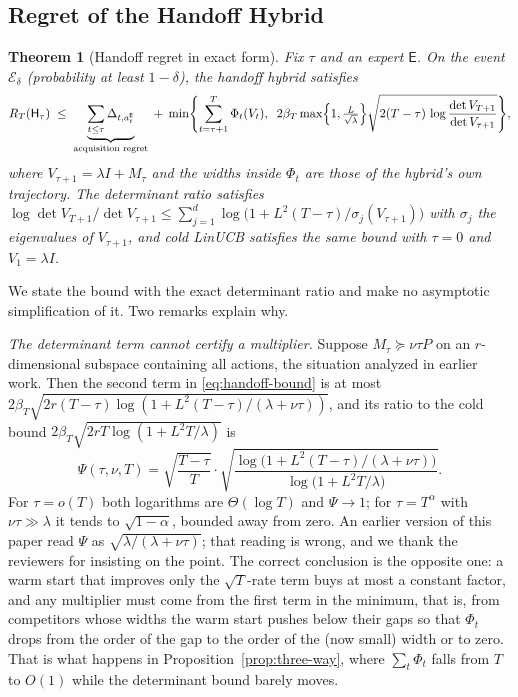 \documentclass{article}
\newtheorem{theorem}{Theorem}
\theoremstyle{definition}
\theoremstyle{remark}
\theoremstyle{remark}
\newcommand{\Exp}{\mathsf{E}}
\newcommand{\Hyb}{\mathsf{H}}
\begin{document}
\subsection{Regret of the Handoff Hybrid}
\label{sec:handoff}

\begin{theorem}[Handoff regret in exact form]
\label{thm:handoff}
Fix $\tau$ and an expert $\Exp$. On the event $\mathcal E_\delta$ (probability
at least $1-\delta$), the handoff hybrid satisfies
\begin{equation}
\label{eq:handoff-bound}
R_T(\Hyb_\tau)\;\le\;
\underbrace{\sum_{t\le\tau}\Delta_{t,a_t^{\Exp}}}_{\text{acquisition regret}}
\;+\;
\min\Biggl\{\sum_{t=\tau+1}^{T}\Phi_t(V_t),\;\;
2\beta_T\max\Bigl\{1,\tfrac{L}{\sqrt\lambda}\Bigr\}\sqrt{2(T-\tau)\,\log\frac{\det V_{T+1}}{\det V_{\tau+1}}}\Biggr\},
\end{equation}
where $V_{\tau+1}=\lambda I+M_\tau$ and the widths inside $\Phi_t$ are those
of the hybrid's own trajectory. The determinant ratio satisfies
$\log\det V_{T+1}/\det V_{\tau+1}\le\sum_{j=1}^{d}\log\bigl(1+L^2(T-\tau)/\sigma_j(V_{\tau+1})\bigr)$
with $\sigma_j$ the eigenvalues of $V_{\tau+1}$, and cold LinUCB satisfies the
same bound with $\tau=0$ and $V_1=\lambda I$.
\end{theorem}

We state the bound with the exact determinant ratio and make no asymptotic
simplification of it. Two remarks explain why.

\emph{The determinant term cannot certify a multiplier.} Suppose
$M_\tau\succeq\nu\tau P$ on an $r$-dimensional subspace containing all actions,
the situation analyzed in earlier work. Then the second term in
\eqref{eq:handoff-bound} is at most
$2\beta_T\sqrt{2r(T-\tau)\log(1+L^2(T-\tau)/(\lambda+\nu\tau))}$, and its ratio
to the cold bound $2\beta_T\sqrt{2rT\log(1+L^2T/\lambda)}$ is
\[
\Psi(\tau,\nu,T)=\sqrt{\frac{T-\tau}{T}}\cdot\sqrt{\frac{\log\bigl(1+L^2(T-\tau)/(\lambda+\nu\tau)\bigr)}{\log\bigl(1+L^2T/\lambda\bigr)}}.
\]
For $\tau=o(T)$ both logarithms are $\Theta(\log T)$ and $\Psi\to1$; for
$\tau=T^{\alpha}$ with $\nu\tau\gg\lambda$ it tends to $\sqrt{1-\alpha}$, bounded
away from zero. An earlier version of this paper read $\Psi$ as
$\sqrt{\lambda/(\lambda+\nu\tau)}$; that reading is wrong, and we thank the
reviewers for insisting on the point. The correct conclusion is the opposite
one: a warm start that improves only the $\sqrt{T}$-rate term buys at most a
constant factor, and any multiplier must come from the first term in the
minimum, that is, from competitors whose widths the warm start pushes below
their gaps so that $\Phi_t$ drops from the order of the gap to the order of
the (now small) width or to zero. That is what happens in
Proposition~\ref{prop:three-way}, where $\sum_t\Phi_t$ falls from $T$ to $O(1)$
while the determinant bound barely moves.
\end{document}
